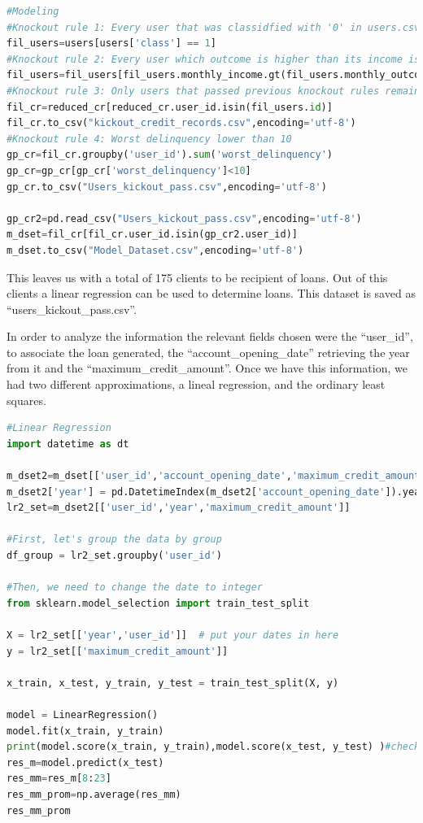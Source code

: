 \documentclass[a4paper,12pt]{article}
\begin{document}
\begin{lstlisting}[language=python,caption = {Knock-out rules}]
#Modeling
#Knockout rule 1: Every user that was classidfied with '0' in users.csv is discarded 
fil_users=users[users['class'] == 1]
#Knockout rule 2: Every user which outcome is higher than its income is discarded
fil_users=fil_users[fil_users.monthly_income.gt(fil_users.monthly_outcome)] 
#Knockout rule 3: Only users that passed previous knockout rules remain on the reduced credit reports
fil_cr=reduced_cr[reduced_cr.user_id.isin(fil_users.id)]
fil_cr.to_csv("kickout_credit_records.csv",encoding='utf-8')
#Knockout rule 4: Worst delinquency lower than 10
gp_cr=fil_cr.groupby('user_id').sum('worst_delinquency')
gp_cr=gp_cr[gp_cr['worst_delinquency']<10]
gp_cr.to_csv("Users_kickout_pass.csv",encoding='utf-8')

gp_cr2=pd.read_csv("Users_kickout_pass.csv",encoding='utf-8')
m_dset=fil_cr[fil_cr.user_id.isin(gp_cr2.user_id)]
m_dset.to_csv("Model_Dataset.csv",encoding='utf-8')
\end{lstlisting}

This leaves us with a total of 175 clients to be recipient of loans. Out of this clients a linear regression can be used to determine loans. This dataset is saved as ``users\_kickout\_pass.csv''.\newpage


In order to analyze the information the relevant fields chosen were the ``user\_id'', to associate the loan generated, the ``account\_opening\_date'' retrieving the year from it and the ``maximum\_credit\_amount''. Once we have this information, we had two different approximations, a lineal regression, and the ordinary least squares.\vspace{3mm}

\begin{lstlisting}[language=python,caption = {Linear  regression}]
#Linear Regression 
import datetime as dt

m_dset2=m_dset[['user_id','account_opening_date','maximum_credit_amount']]
m_dset2['year'] = pd.DatetimeIndex(m_dset2['account_opening_date']).year
lr2_set=m_dset2[['user_id','year','maximum_credit_amount']]

#First, let's group the data by group
df_group = lr2_set.groupby('user_id')

#Then, we need to change the date to integer
from sklearn.model_selection import train_test_split

X = lr2_set[['year','user_id']]  # put your dates in here
y = lr2_set[['maximum_credit_amount']]

x_train, x_test, y_train, y_test = train_test_split(X, y)

model = LinearRegression()
model.fit(x_train, y_train)
print(model.score(x_train, y_train),model.score(x_test, y_test) )#check score
res_m=model.predict(x_test)
res_mm=res_m[8:23]
res_mm_prom=np.average(res_mm)
res_mm_prom
\end{lstlisting}\newpage
\end{document}
